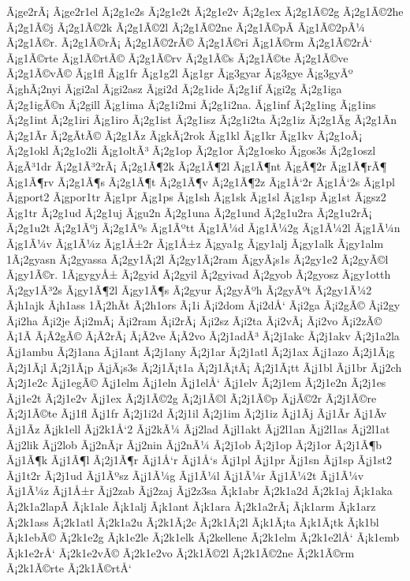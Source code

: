 {Ã¡ge2rÃ¡
Ã¡ge2r1el
Ã¡2g1e2s
Ã¡2g1e2t
Ã¡2g1e2v
Ã¡2g1ex
Ã¡2g1Ã©2g
Ã¡2g1Ã©2he
Ã¡2g1Ã©j
Ã¡2g1Ã©2k
Ã¡2g1Ã©2l
Ã¡2g1Ã©2ne
Ã¡2g1Ã©pÃ­
Ã¡g1Ã©2pÃ¼
Ã¡2g1Ã©r.
Ã¡2g1Ã©rÃ¡
Ã¡2g1Ã©2rÃ©
Ã¡2g1Ã©ri
Ã¡g1Ã©rm
Ã¡2g1Ã©2rÅ‘
Ã¡g1Ã©rte
Ã¡g1Ã©rtÃ©
Ã¡2g1Ã©rv
Ã¡2g1Ã©s
Ã¡2g1Ã©te
Ã¡2g1Ã©ve
Ã¡2g1Ã©vÃ©
Ã¡g1fl
Ã¡g1fr
Ã¡g1g2l
Ã¡g1gr
Ã¡g3gyar
Ã¡g3gye
Ã¡g3gyÃº
Ã¡ghÃ¡2nyi
Ã¡gi2al
Ã¡gi2asz
Ã¡gi2d
Ã¡2g1ide
Ã¡2g1if
Ã¡gi2g
Ã¡2g1iga
Ã¡2g1igÃ©n
Ã¡2gill
Ã¡g1ima
Ã¡2g1i2mi
Ã¡2g1i2na.
Ã¡g1inf
Ã¡2g1ing
Ã¡g1ins
Ã¡2g1int
Ã¡2g1iri
Ã¡g1iro
Ã¡2g1ist
Ã¡2g1isz
Ã¡2g1i2ta
Ã¡2g1iz
Ã¡2g1Ã­g
Ã¡2g1Ã­n
Ã¡2g1Ã­r
Ã¡2gÃ­tÃ©
Ã¡2g1Ã­z
Ã¡gkÃ¡2rok
Ã¡g1kl
Ã¡g1kr
Ã¡g1kv
Ã¡2g1oÃ¡
Ã¡2g1okl
Ã¡2g1o2li
Ã¡g1oltÃ³
Ã¡2g1op
Ã¡2g1or
Ã¡2g1osko
Ã¡gos3s
Ã¡2g1oszl
Ã¡gÃ³1dr
Ã¡2g1Ã³2rÃ¡
Ã¡2g1Ã¶2k
Ã¡2g1Ã¶2l
Ã¡g1Ã¶nt
Ã¡gÃ¶2r
Ã¡g1Ã¶rÃ¶
Ã¡g1Ã¶rv
Ã¡2g1Ã¶s
Ã¡2g1Ã¶t
Ã¡2g1Ã¶v
Ã¡2g1Ã¶2z
Ã¡g1Å‘2r
Ã¡g1Å‘2s
Ã¡g1pl
Ã¡gport2
Ã¡gpor1tr
Ã¡g1pr
Ã¡g1ps
Ã¡g1sh
Ã¡g1sk
Ã¡g1sl
Ã¡g1sp
Ã¡g1st
Ã¡gsz2
Ã¡g1tr
Ã¡2g1ud
Ã¡2g1uj
Ã¡gu2n
Ã¡2g1una
Ã¡2g1und
Ã¡2g1u2ra
Ã¡2g1u2rÃ¡
Ã¡2g1u2t
Ã¡2g1Ãºj
Ã¡2g1Ãºs
Ã¡g1Ãºtt
Ã¡g1Ã¼d
Ã¡g1Ã¼2g
Ã¡g1Ã¼2l
Ã¡g1Ã¼n
Ã¡g1Ã¼v
Ã¡g1Ã¼z
Ã¡g1Å±2r
Ã¡g1Å±z
Ã¡gya1g
Ã¡gy1alj
Ã¡gy1alk
Ã¡gy1alm
1Ã¡2gyasn
Ã¡2gyassa
Ã¡2gy1Ã¡2l
Ã¡2gy1Ã¡2ram
Ã¡gyÃ¡s1s
Ã¡2gy1e2
Ã¡2gyÃ©l
Ã¡gy1Ã©r.
1Ã¡gygyÅ±
Ã¡2gyid
Ã¡2gyil
Ã¡2gyivad
Ã¡2gyob
Ã¡2gyosz
Ã¡gy1otth
Ã¡2gy1Ã³2s
Ã¡gy1Ã¶2l
Ã¡gy1Ã¶s
Ã¡2gyur
Ã¡2gyÃºh
Ã¡2gyÃºt
Ã¡2gy1Ã¼2
Ã¡h1ajk
Ã¡h1ass
1Ã¡2hÃ­t
Ã¡2h1ors
Ã¡1i
Ã¡i2dom
Ã¡i2dÅ‘
Ã¡i2ga
Ã¡i2gÃ©
Ã¡i2gy
Ã¡i2ha
Ã¡i2je
Ã¡i2mÃ¡
Ã¡i2ram
Ã¡i2rÃ¡
Ã¡i2sz
Ã¡i2ta
Ã¡i2vÃ¡
Ã¡i2vo
Ã¡i2zÃ©
Ã¡1Ã­
Ã¡Ã­2gÃ©
Ã¡Ã­2rÃ¡
Ã¡Ã­2ve
Ã¡Ã­2vo
Ã¡2j1adÃ³
Ã¡2j1akc
Ã¡2j1akv
Ã¡2j1a2la
Ã¡j1ambu
Ã¡2j1ana
Ã¡j1ant
Ã¡2j1any
Ã¡2j1ar
Ã¡2j1atl
Ã¡2j1ax
Ã¡j1azo
Ã¡2j1Ã¡g
Ã¡2j1Ã¡l
Ã¡2j1Ã¡p
Ã¡jÃ¡s3s
Ã¡2j1Ã¡t1a
Ã¡2j1Ã¡tÃ¡
Ã¡2j1Ã¡tt
Ã¡j1bl
Ã¡j1br
Ã¡j2ch
Ã¡2j1e2c
Ã¡j1egÃ©
Ã¡j1elm
Ã¡j1eln
Ã¡j1elÅ‘
Ã¡j1elv
Ã¡2j1em
Ã¡2j1e2n
Ã¡2j1es
Ã¡j1e2t
Ã¡2j1e2v
Ã¡j1ex
Ã¡2j1Ã©2g
Ã¡2j1Ã©l
Ã¡2j1Ã©p
Ã¡jÃ©2r
Ã¡2j1Ã©re
Ã¡2j1Ã©te
Ã¡j1fl
Ã¡j1fr
Ã¡2j1i2d
Ã¡2j1il
Ã¡2j1im
Ã¡2j1iz
Ã¡j1Ã­j
Ã¡j1Ã­r
Ã¡j1Ã­v
Ã¡j1Ã­z
Ã¡jk1ell
Ã¡j2k1Å‘2
Ã¡j2kÃ¼
Ã¡j2lad
Ã¡jl1akt
Ã¡j2l1an
Ã¡j2l1as
Ã¡j2l1at
Ã¡j2lik
Ã¡j2lob
Ã¡j2nÃ¡r
Ã¡j2nin
Ã¡j2nÃ¼
Ã¡2j1ob
Ã¡2j1op
Ã¡2j1or
Ã¡2j1Ã¶b
Ã¡j1Ã¶k
Ã¡j1Ã¶l
Ã¡2j1Ã¶r
Ã¡j1Å‘r
Ã¡j1Å‘s
Ã¡j1pl
Ã¡j1pr
Ã¡j1sn
Ã¡j1sp
Ã¡j1st2
Ã¡j1t2r
Ã¡2j1ud
Ã¡j1Ãºsz
Ã¡j1Ã¼g
Ã¡j1Ã¼l
Ã¡j1Ã¼r
Ã¡j1Ã¼2t
Ã¡j1Ã¼v
Ã¡j1Ã¼z
Ã¡j1Å±r
Ã¡j2zab
Ã¡j2zaj
Ã¡j2z3sa
Ã¡k1abr
Ã¡2k1a2d
Ã¡2k1aj
Ã¡k1aka
Ã¡2k1a2lapÃ­
Ã¡k1ale
Ã¡k1alj
Ã¡k1ant
Ã¡k1ara
Ã¡2k1a2rÃ¡
Ã¡k1arm
Ã¡k1arz
Ã¡2k1ass
Ã¡2k1atl
Ã¡2k1a2u
Ã¡2k1Ã¡2c
Ã¡2k1Ã¡2l
Ã¡k1Ã¡ta
Ã¡k1Ã¡tk
Ã¡k1bl
Ã¡k1ebÃ©
Ã¡2k1e2g
Ã¡k1e2le
Ã¡2k1elk
Ã¡2kellene
Ã¡2k1elm
Ã¡2k1e2lÅ‘
Ã¡k1emb
Ã¡k1e2rÅ‘
Ã¡2k1e2vÃ©
Ã¡2k1e2vo
Ã¡2k1Ã©2l
Ã¡2k1Ã©2ne
Ã¡2k1Ã©rm
Ã¡2k1Ã©rte
Ã¡2k1Ã©rtÅ‘
}
